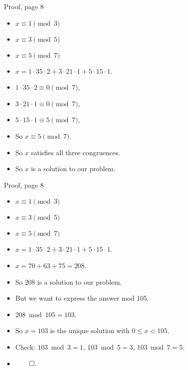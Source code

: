 \documentclass[handout]{beamer}
\begin{document}
\begin{frame}{Proof, page 8}

\begin{itemize}
  \item $x \equiv 1 \pmod 3$
  \item $x \equiv 3 \pmod 5$
  \item $x \equiv 5 \pmod 7$
  \item $x = 1 \cdot 35 \cdot 2 + 3 \cdot 21 \cdot 1 + 5 \cdot 15 \cdot 1$.
  \item $1 \cdot 35 \cdot 2 \equiv 0 \pmod 7$,
  \item $3 \cdot 21 \cdot 1 \equiv 0 \pmod 7$,
  \item $5 \cdot 15 \cdot 1 \equiv 5 \pmod 7$,
  \item So $x \equiv 5 \pmod 7$.
  \item So $x$ satisfies all three congruences.
  \item So $x$ is a solution to our problem.
\end{itemize}

\end{frame}

\begin{frame}{Proof, page 8}

\begin{itemize}
  \item $x \equiv 1 \pmod 3$
  \item $x \equiv 3 \pmod 5$
  \item $x \equiv 5 \pmod 7$
  \item $x = 1 \cdot 35 \cdot 2 + 3 \cdot 21 \cdot 1 + 5 \cdot 15 \cdot 1$.
  \item $x = 70 + 63 + 75 = 208$.
  \item So $208$ is a solution to our problem.
  \item But we want to express the answer mod 105.
  \item $208 \bmod 105 = 103$.
  \item So $x=103$ is the unique solution with $0\leq x < 105$.
  \item Check: $103 \bmod 3 = 1$, $103 \bmod  5 = 3$, $103\bmod 7 = 5$.
  \item $\qed$.
\end{itemize}

\end{frame}
\end{document}
